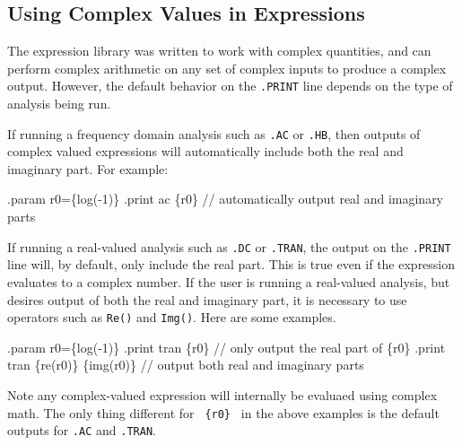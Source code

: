 \begin{centering}
\end{centering}

\subsection{Using Complex Values in Expressions}
\label{ComplexExpressions}
The \Xyce{} expression library was written to work with complex
quantities, and can perform complex arithmetic on any set of 
complex inputs to produce a complex output.
However, the default behavior on the \texttt{.PRINT} line depends 
on the type of analysis being run.  

If running a frequency domain analysis such as \texttt{.AC} or \texttt{.HB}, then outputs of complex valued expressions will automatically include both the real and imaginary part.  For example:
\begin{vquote}
.param r0=\{log(-1)\}
.print ac \{r0\} // automatically output real and imaginary parts
\end{vquote}


If running a real-valued analysis such as \texttt{.DC} or \texttt{.TRAN}, the output on the \texttt{.PRINT} line will, by default, only include the real part.  This is true even if the expression evaluates to a complex number.
If the user is running a real-valued analysis, but desires output of both the real and imaginary part, it is necessary to use operators such as \texttt{Re()} and \texttt{Img()}.  Here are some examples.


\begin{vquote}
.param r0=\{log(-1)\}
.print tran \{r0\} // only output the real part of \{r0\}
.print tran  \{re(r0)\} \{img(r0)\} // output both real and imaginary parts 
\end{vquote}

Note any complex-valued expression will internally be evaluaed using complex math.
The only thing different for \texttt{ \{r0\} } in the above examples is the default outputs for \texttt{.AC} and \texttt{.TRAN}.

